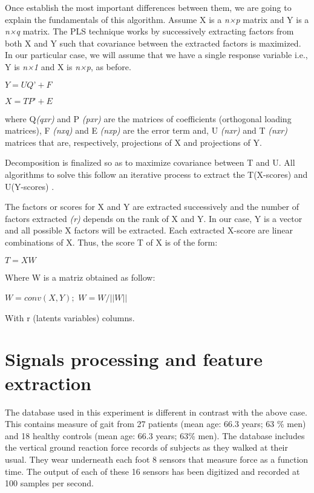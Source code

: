 Once establish the most important differences between them, we are going to explain the fundamentals of this algorithm. 
Assume X is a \textit{n×p} matrix and Y is a \textit{n×q} matrix. The PLS technique works by successively extracting factors from both X and Y such that covariance between the extracted factors is maximized. In our particular case, we will assume that we have a single response variable i.e., Y is \textit{n×1} and X is \textit{n×p}, as before.

\begin{center}
	$ Y= UQ’+F $

$ X=TP’+E $
\end{center}

where Q\textit{(qxr)} and P \textit{(pxr)} are the matrices of coefficients (orthogonal loading matrices), F \textit{(nxq)} and E \textit{(nxp)} are the error term and, U \textit{(nxr)} and T \textit{(nxr)} matrices that are, respectively, projections of X and projections of Y.

Decomposition is finalized so as to maximize covariance between T and U. All algorithms to solve this follow an iterative process to extract the T(X-scores) and U(Y-scores) \cite{pls_pca}. 

The factors or scores for X and Y are extracted successively and the number of factors extracted \textit{(r)} depends on the rank of X and Y. In our case, Y is a vector and all possible X factors will be extracted.
Each extracted X-score are linear combinations of X. Thus, the score T of X is of the form: 

\begin{center}
	$ T= XW $
\end{center}

Where  W is a matriz obtained as follow:

\begin{center}
	$ W= conv(X,Y); $
$ W = W/||W|| $
\end{center}

With r (latents variables) columns.

\section{Signals processing and feature extraction}
The database used in this experiment  is different in contrast with the above case. This contains measure of gait from 27 patients (mean age: 66.3 years; 63 \% men) and 18 healthy controls (mean age: 66.3 years; 63\% men). The database includes the vertical ground reaction force records of subjects as they walked at their usual. They wear underneath each foot 8 sensors \cite{Instr6} that measure force as a function time. The output of each of these 16 sensors has been digitized and recorded at 100 samples per second.


